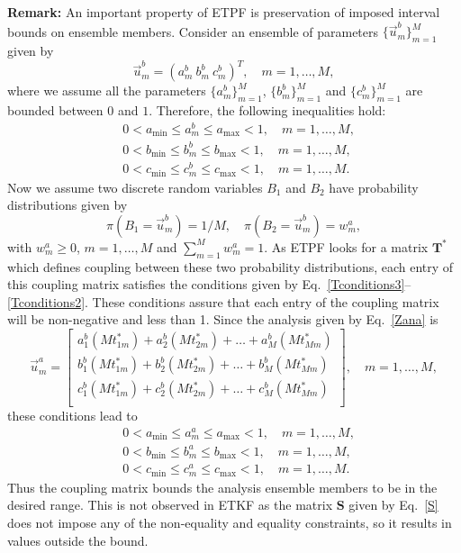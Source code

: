 \documentclass[12, a4paper]{article}
\numberwithin{equation}{section}
\begin{document}
\textbf{Remark:} An important property of ETPF is preservation of imposed  interval bounds on ensemble members. Consider an ensemble of parameters $\{\vec{u}_m^b\}_{m=1}^M$  given by
\begin{equation*}
\vec{u}_m^b = (a_m^b  \ b_m^b \ c_m^b)^T,  \quad m = 1,\hdots,M, 
\end{equation*}
where we assume all the parameters $\{a_m^b\}_{m=1}^M$, $\{b_m^b\}_{m=1}^M$ and $\{c_m^b\}_{m=1}^M$ are bounded between $0$ and $1$. Therefore, the following inequalities hold:
\begin{align*} 
& 0 < a_\textrm{min} \leq a_m^b \leq a_\textrm{max} <1, \quad m=1,\hdots,M, \\
& 0 < b_\textrm{min} \leq b_m^b \leq b_\textrm{max} <1,  \quad m=1,\hdots,M, \\
& 0 < c_\textrm{min} \leq c_m^b \leq c_\textrm{max} <1, \quad m=1,\hdots,M. 
\end{align*} 
Now we assume two discrete random variables $B_1$ and $B_2$ have probability distributions given by
\begin{equation}
\pi (B_1 = \vec{u}_m^b) = 1/M, \quad \pi (B_2 = \vec{u}_m^b) =w_m^a, \nonumber
\end{equation}
with $w_m^a \geq 0$, $m=1,\hdots ,M$ and $\sum_{m=1}^{M}w_m^a =1 $. As ETPF looks for a matrix $\textbf{T}^{*}$ which defines coupling between these two probability distributions, each entry of this coupling matrix satisfies the conditions given by Eq.~\eqref{Tconditions3}--\eqref{Tconditions2}. These conditions assure that each entry of the coupling matrix will be non-negative and less than 1.
Since the  analysis given  by Eq.~\eqref{Zana} is
\begin{equation}
\vec{u}^a_m = \begin{bmatrix}
a_1^b(Mt^{*}_{1m})+a_2^b(Mt^{*}_{2m})+ \dots +a_M^b(Mt^{*}_{Mm})\\
b_1^b(Mt^{*}_{1m})+b_2^b(Mt^{*}_{2m})+ \dots +b_M^b(Mt^{*}_{Mm})\\
c_1^b(Mt^{*}_{1m})+c_2^b(Mt^{*}_{2m})+ \dots +c_M^b(Mt^{*}_{Mm})\\
\end{bmatrix},  \quad m=1,\dots,M, \nonumber
\end{equation}
these conditions lead to 
\begin{align*}
& 0 < a_\textrm{min} \leq a_m^a \leq a_\textrm{max} <1, \quad m=1,\dots,M, \\
& 0 < b_\textrm{min} \leq b_m^a \leq b_\textrm{max} <1,  \quad m=1,\dots,M, \\
& 0 < c_\textrm{min} \leq c_m^a \leq c_\textrm{max} <1,  \quad m=1,\dots,M.  
\end{align*}
Thus the coupling matrix bounds the analysis ensemble members to be in the desired range. This is not observed in ETKF as the matrix $\textbf{S}$ given by Eq.~\eqref{S} does not impose any of the non-equality and equality constraints,  so it results in values outside the bound.
\end{document}
